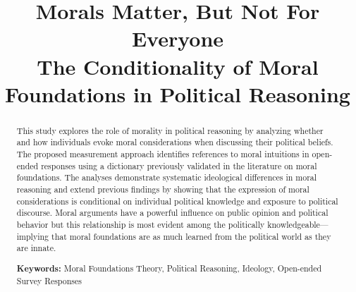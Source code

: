 \documentclass[12pt]{article}
\date{}
\title{Morals Matter, But Not For Everyone
\\
\large{The Conditionality of Moral Foundations in Political Reasoning}}
\begin{document}
\maketitle
\doublespacing
\thispagestyle{empty}

\begin{abstract}
This study explores the role of morality in political reasoning by analyzing whether and how individuals evoke moral considerations when discussing their political beliefs. The proposed measurement approach identifies references to moral intuitions in open-ended responses using a dictionary previously validated in the literature on moral foundations. The analyses demonstrate systematic ideological differences in moral reasoning and extend previous findings by showing that the expression of moral considerations is conditional on individual political knowledge and exposure to political discourse. Moral arguments have a powerful influence on public opinion and political behavior but this relationship is most evident among the politically knowledgeable---implying that moral foundations are as much learned from the political world as they are innate.

\vspace{\baselineskip}
\noindent \textbf{Keywords:} Moral Foundations Theory, Political Reasoning, Ideology, Open-ended Survey Responses
\end{abstract}
\newpage
\setcounter{page}{1}

\end{document}
